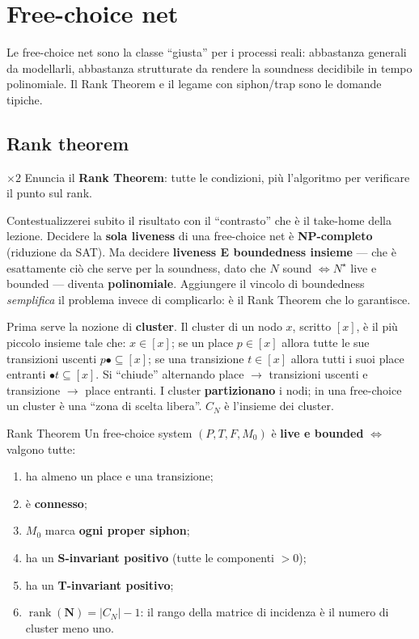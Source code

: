 \chapter{Free-choice net}

Le free-choice net sono la classe ``giusta'' per i processi reali: abbastanza generali da modellarli, abbastanza strutturate da rendere la soundness decidibile in tempo polinomiale. Il Rank Theorem e il legame con siphon/trap sono le domande tipiche.

\section{Rank theorem}

\begin{domanda}{$\times 2$}
Enuncia il \textbf{Rank Theorem}: tutte le condizioni, più l'algoritmo per verificare il punto sul rank.
\end{domanda}

Contestualizzerei subito il risultato con il ``contrasto'' che è il take-home della lezione. Decidere la \textbf{sola liveness} di una free-choice net è \textbf{NP-completo} (riduzione da SAT). Ma decidere \textbf{liveness E boundedness insieme} — che è esattamente ciò che serve per la soundness, dato che $N$ sound $\iff N^\star$ live e bounded — diventa \textbf{polinomiale}. Aggiungere il vincolo di boundedness \emph{semplifica} il problema invece di complicarlo: è il Rank Theorem che lo garantisce.

Prima serve la nozione di \textbf{cluster}. Il cluster di un nodo $x$, scritto $[x]$, è il più piccolo insieme tale che: $x \in [x]$; se un place $p \in [x]$ allora tutte le sue transizioni uscenti $p\bullet \subseteq [x]$; se una transizione $t \in [x]$ allora tutti i suoi place entranti $\bullet t \subseteq [x]$. Si ``chiude'' alternando place $\to$ transizioni uscenti e transizione $\to$ place entranti. I cluster \textbf{partizionano} i nodi; in una free-choice un cluster è una ``zona di scelta libera''. $C_N$ è l'insieme dei cluster.

\begin{teorema}{Rank Theorem}
Un free-choice system $(P,T,F,M_0)$ è \textbf{live e bounded} $\iff$ valgono tutte:
\begin{enumerate}
  \item ha almeno un place e una transizione;
  \item è \textbf{connesso};
  \item $M_0$ marca \textbf{ogni proper siphon};
  \item ha un \textbf{S-invariant positivo} (tutte le componenti $>0$);
  \item ha un \textbf{T-invariant positivo};
  \item $\operatorname{rank}(\mathbf{N}) = |C_N| - 1$: il rango della matrice di incidenza è il numero di cluster meno uno.
\end{enumerate}
\end{teorema}

